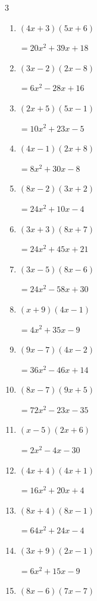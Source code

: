 \begin{multicols}{3}
\begin{enumerate}
        $=24x^{2}-68x+40$

\columnbreak %

  \item $(4x+3)(5x+6)$

        $=20x^{2}+39x+18$

  \item $(3x-2)(2x-8)$

        $=6x^{2}-28x+16$

  \item $(2x+5)(5x-1)$

        $=10x^{2}+23x-5$

  \item $(4x-1)(2x+8)$

        $=8x^{2}+30x-8$

  \item $(8x-2)(3x+2)$

        $=24x^{2}+10x-4$

  \item $(3x+3)(8x+7)$

        $=24x^{2}+45x+21$

  \item $(3x-5)(8x-6)$

        $=24x^{2}-58x+30$

  \item $(x+9)(4x-1)$

        $=4x^{2}+35x-9$

  \item $(9x-7)(4x-2)$

        $=36x^{2}-46x+14$

  \item $(8x-7)(9x+5)$

        $=72x^{2}-23x-35$

  \item $(x-5)(2x+6)$

        $=2x^{2}-4x-30$

  \item $(4x+4)(4x+1)$

        $=16x^{2}+20x+4$

  \item $(8x+4)(8x-1)$

        $=64x^{2}+24x-4$

  \item $(3x+9)(2x-1)$

        $=6x^{2}+15x-9$

  \item $(8x-6)(7x-7)$


\end{enumerate}
\end{multicols}
